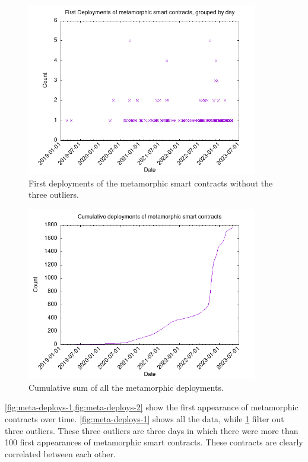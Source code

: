 \begin{figure}
    \centering
    \includegraphics[width=0.9\textwidth]{Figures/analysis/metamorphic-first_deploys_no_outliers.png}
    \caption{First deployments of the metamorphic smart contracts without the three outliers.}
    \label{fig:meta-deploys-2}
\end{figure}

\begin{figure}
    \centering
    \includegraphics[width=0.9\textwidth]{Figures/analysis/metamorphic-all_deployments.png}
    \caption{Cumulative sum of all the metamorphic deployments.}
    \label{fig:meta-deploys-all}
\end{figure}

\cref{fig:meta-deploys-1,fig:meta-deploys-2} show the first appearance of metamorphic contracts over time. \cref{fig:meta-deploys-1} shows all the data, while \cref{fig:meta-deploys-2} filter out three outliers. These three outliers are three days in which there were more than 100 first appearances of metamorphic smart contracts. These contracts are clearly correlated between each other. 

